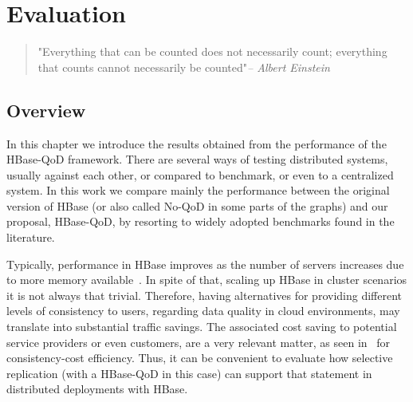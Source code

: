 
%
%


\chapter{Evaluation}
\label{ch:evaluation}

\begin{quotation}
  {\small\it }"Everything that can be counted does not necessarily count; everything that counts cannot necessarily be counted"{\small\it -- Albert Einstein }
\end{quotation}



\section{Overview}
In this chapter we introduce the results obtained from the performance of the HBase-QoD framework. There are several ways of testing distributed systems, usually against each other, or compared to benchmark, or even to a centralized system. In this work we compare mainly  the performance between the original version of HBase (or also called No-QoD in some parts of the graphs) and our proposal, HBase-QoD, by resorting to widely adopted benchmarks found in the literature.

Typically, performance in HBase improves as the number of servers increases due to more memory available~\cite{Carstoiu:2010}. In spite of that, scaling up HBase in cluster scenarios it is not always that trivial. Therefore, having alternatives for providing different levels of consistency to users, regarding data quality in cloud environments, may translate into substantial traffic savings. The associated cost saving to potential service providers or even customers, are a very relevant matter,  as seen in~\cite{chihoub:2013} for consistency-cost efficiency. Thus, it can be convenient to evaluate how selective replication (with a HBase-QoD in this case) can support that statement in distributed deployments with HBase.

